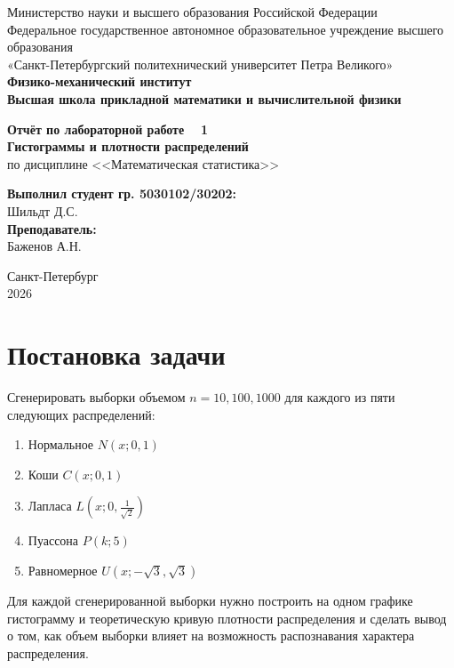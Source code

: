 \documentclass[a4paper, 14pt]{extarticle}
\begin{document}
\begin{titlepage}
    \begin{center}
        Министерство науки и высшего образования Российской Федерации\\
        Федеральное государственное автономное образовательное учреждение высшего образования\\
        «Санкт-Петербургский политехнический университет Петра Великого»\\
        
        \textbf{Физико-механический институт}\\
        \textbf{Высшая школа прикладной математики и вычислительной физики}
    \end{center}

    \vfill
    
    \begin{center}
        \textbf{Отчёт по лабораторной работе \textnumero~ 1\\[0.5cm]}
        \textbf{Гистограммы и плотности распределений\\}
        по дисциплине <<Математическая статистика>>
    \end{center}

    \vfill

    \hfill
    \begin{minipage}{0.45\textwidth}
        \textbf{Выполнил студент гр. 5030102/30202:}\\
        Шильдт Д.С.\\[0.5cm]
        \textbf{Преподаватель:}\\ 
        Баженов А.Н.
    \end{minipage}

    \vfill

    \begin{center}
        Санкт-Петербург\\2026
    \end{center}
\end{titlepage}

\setcounter{page}{2}

\tableofcontents
\newpage

\section{Постановка задачи}

Сгенерировать выборки объемом $n = 10, 100, 1000$ для каждого из пяти следующих распределений:
\begin{enumerate}
    \item Нормальное $N(x;0,1)$
    \item Коши $C(x;0,1)$
    \item Лапласа $L(x;0,\frac{1}{\sqrt{2}})$
    \item Пуассона $P(k;5)$
    \item Равномерное $U(x;-\sqrt{3}, \sqrt{3})$
\end{enumerate}
Для каждой сгенерированной выборки нужно построить на одном графике гистограмму и теоретическую кривую плотности распределения и сделать вывод о том, как объем выборки влияет на возможность распознавания характера распределения.
\end{document}
